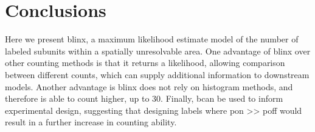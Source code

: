 \section{Conclusions}

Here we present blinx, a maximum likelihood estimate model of the number of
labeled subunits within a spatially unresolvable area. One advantage of blinx
over other counting methods is that it returns a likelihood, allowing
comparison between different counts, which can supply additional information to
downstream models. Another advantage is blinx does not rely on histogram
methods, and therefore is able to count higher, up to 30. Finally, bcan be used
to inform experimental design, suggesting that designing labels where pon >>
poff would result in a further increase in counting ability.

